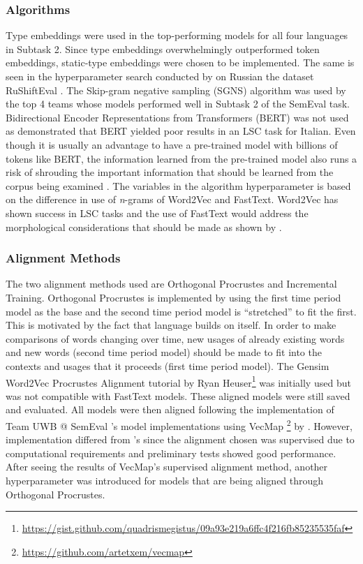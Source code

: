 \subsubsection{Algorithms}

Type embeddings were used in the top-performing models for all four languages in Subtask 2.  Since type embeddings overwhelmingly outperformed token embeddings, static-type embeddings were chosen to be implemented. The same is seen in the hyperparameter search conducted by \citet{hengchen2021SBXrushifteval} on Russian the dataset RuShiftEval \citep{rushifteval2021}. The Skip-gram negative sampling (SGNS) algorithm was used by the top 4 teams whose models performed well in Subtask 2 of the SemEval task. Bidirectional Encoder Representations from Transformers (BERT) was not used as \citet{laicher-2020} demonstrated that BERT yielded poor results in an LSC task for Italian. Even though it is usually an advantage to have a pre-trained model with billions of tokens like BERT, the information learned from the pre-trained model also runs a risk of shrouding the important information that should be learned from the corpus being examined \citep{hengchen2021challenges}. The variables in the algorithm hyperparameter is based on the difference in use of \emph{n}-grams of Word2Vec and FastText. Word2Vec has shown success in LSC tasks and the use of FastText would address the morphological considerations that should be made as shown by \citet{bojanowski2017enriching}. 


\subsubsection{Alignment Methods}

The two alignment methods used are Orthogonal Procrustes and Incremental Training. Orthogonal Procrustes is implemented by using the first time period model as the base and the second time period model is “stretched” to fit the first. This is motivated by the fact that language builds on itself. In order to make comparisons of words changing over time, new usages of already existing words and new words (second time period model) should be made to fit into the contexts and usages that it proceeds (first time period model). The Gensim Word2Vec Procrustes Alignment tutorial by Ryan Heuser\footnote{\url{https://gist.github.com/quadrismegistus/09a93e219a6ffc4f216fb85235535faf}}  was initially used but was not compatible with FastText models. These aligned models were still saved and evaluated. All models were then aligned following the implementation of Team UWB @ SemEval \citet{prazak-etal-2020-uwb}’s model implementations using VecMap \footnote{\url{https://github.com/artetxem/vecmap}} by \citet{artetxe2018generalizing}. However, implementation differed from \citet{prazak-etal-2020-uwb}’s since the alignment chosen was supervised due to computational requirements and preliminary tests showed good performance. After seeing the results of VecMap’s supervised alignment method, another hyperparameter was introduced for models that are being aligned through Orthogonal Procrustes.

